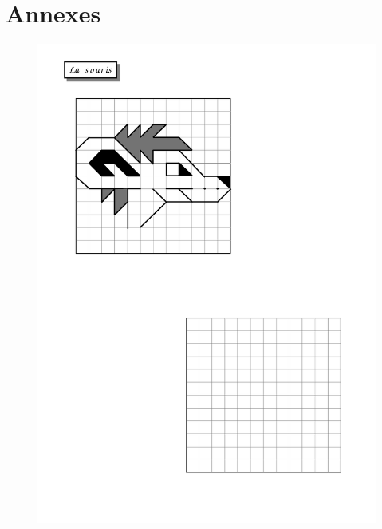 \newpage

\section*{Annexes}

\label{souris}
\begin{figure}[H]
  \centering
  \includegraphics[width=\linewidth]{sources/pages/1.1.1/1-souris.pdf}
  \caption{\label{coq}}
\end{figure}


